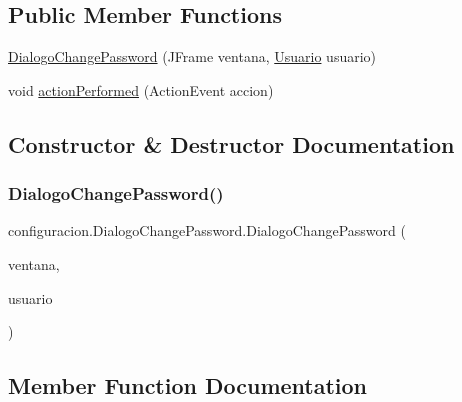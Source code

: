 \subsection*{Public Member Functions}
\begin{DoxyCompactItemize}
\item 
\mbox{\hyperlink{classconfiguracion_1_1_dialogo_change_password_adc5cae50957d80f0c510591bb8216a5c}{Dialogo\+Change\+Password}} (J\+Frame ventana, \mbox{\hyperlink{classclases_1_1_usuario}{Usuario}} usuario)
\item 
void \mbox{\hyperlink{classconfiguracion_1_1_dialogo_change_password_a085982d24548bfce1e2d1e7dd3465f34}{action\+Performed}} (Action\+Event accion)
\end{DoxyCompactItemize}


\subsection{Constructor \& Destructor Documentation}
\mbox{\label{classconfiguracion_1_1_dialogo_change_password_adc5cae50957d80f0c510591bb8216a5c}} 
\subsubsection{\texorpdfstring{Dialogo\+Change\+Password()}{DialogoChangePassword()}}
{\footnotesize\ttfamily configuracion.\+Dialogo\+Change\+Password.\+Dialogo\+Change\+Password (\begin{DoxyParamCaption}\item[{J\+Frame}]{ventana,  }\item[{\mbox{\hyperlink{classclases_1_1_usuario}{Usuario}}}]{usuario }\end{DoxyParamCaption})}



\subsection{Member Function Documentation}
\mbox{\label{classconfiguracion_1_1_dialogo_change_password_a085982d24548bfce1e2d1e7dd3465f34}} 
